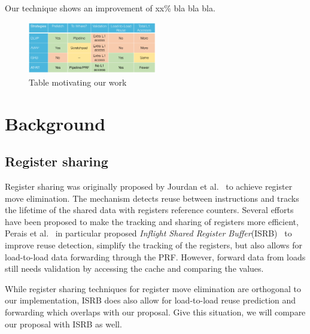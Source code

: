 \documentclass{sig-alternate}
\begin{document}
Our technique shows an improvement of xx\% bla bla bla.


\begin{figure}[ht]
\centerline{\includegraphics[width=0.50\textwidth]{diagrams/VsTable.pdf}}
\caption{Table motivating our work}
\label{fig:DistVsValue}
\end{figure}





























\section{Background}

\subsection{Register sharing}
Register sharing was originally proposed by Jourdan et al.~\cite{} to achieve register move elimination. The mechanism detects reuse between instructions and tracks the lifetime of the shared data with registers reference counters. Several efforts have been proposed to make the tracking and sharing of registers more efficient, Perais et al.~\cite{} in particular proposed \textit{Inflight Shared Register Buffer}(ISRB)~\cite{} to improve reuse detection, simplify the tracking of the registers, but also allows for load-to-load data forwarding through the PRF. However, forward data from loads still needs validation by accessing the cache and comparing the values.

While register sharing techniques for register move elimination are orthogonal to our implementation, ISRB does also allow for load-to-load reuse prediction and forwarding which overlaps with our proposal. Give this situation, we will compare our proposal with ISRB as well.
\end{document}
